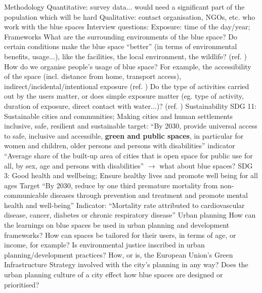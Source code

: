\documentclass{article}
\begin{document}
\begin{outline}
	\1 Methodology
		\2 Quantitative: survey data... would need a significant part of the population which will be hard
		\2 Qualitative: contact organisation, NGOs, etc. who work with the blue spaces
		\2 Interview questions:
			\3 Exposure: time of the day/year; 
	\1 Frameworks
		\2 What are the surrounding environments of the blue space? Do certain conditions make the blue space ``better'' (in terms of environmental benefits, usage...), like the facilities, the local environment, the wildlife? (ref. \parencite{garrett2019urban})
		\2 How do we organise people's usage of blue space? For example, the accessibility of the space (incl. distance from home, transport access), indirect/incidental/intentional exposure (ref. \parencite{garrett2019urban})
		\2 Do the type of activities carried out by the users matter, or does simple exposure matter (eg. type of activity, duration of exposure, direct contact with water...)? (ref. \parencite{garrett2019urban})
	\1 Sustainability
		\2 SDG 11: Sustainable cities and communities; Making cities and human settlements inclusive, safe, resilient and sustainable
			 target: ``By 2030, provide universal access to safe, inclusive and accessible, \textbf{green and public spaces}, in particular for women and children, older persons and persons with disabilities''
			 indicator ``Average share of the built-up area of cities that is open space for public use for all, by sex, age and persons with disabilities'' $\rightarrow$ what about blue spaces?
		\2 SDG 3: Good health and wellbeing; Ensure healthy lives and promote well being for all ages
			 Target ``By 2030, reduce by one third premature mortality from non-communicable diseases through prevention and treatment and promote mental health and well-being''
			 Indicator: ``Mortality rate attributed to cardiovascular disease, cancer, diabetes or chronic respiratory disease''
	\1 Urban planning
		\2 How can the learnings on blue spaces be used in urban planning and development frameworks? How can spaces be tailored for their users, in terms of age, or income, for example?
		\2 Is environmental justice inscribed in urban planning/development practices?
		\2 How, or is, the European Union's Green Infrastructure Strategy involved with the city's planning in any way?
		\2 Does the urban planning culture of a city effect how blue spaces are designed or prioritised?
\end{outline}

\end{document}
